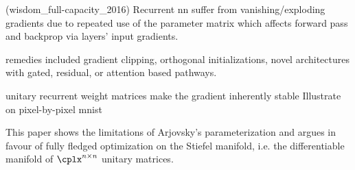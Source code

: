 (wisdom_full-capacity_2016)
Recurrent nn suffer from vanishing/exploding gradients due to repeated use of the parameter matrix
which affects forward pass and backprop via layers' input gradients.

remedies included gradient clipping, orthogonal initializations, novel architectures with
gated, residual, or attention based pathways.

unitary recurrent weight matrices make the gradient inherently stable \citep{arjovsky_unitary_2016}
Illustrate on pixel-by-pixel mnist

This paper shows the limitations of Arjovsky's parameterization and argues in favour of fully fledged
optimization on the Stiefel manifold, i.e. the differentiable manifold of $\cplx^{n \times n}$ unitary
matrices.
